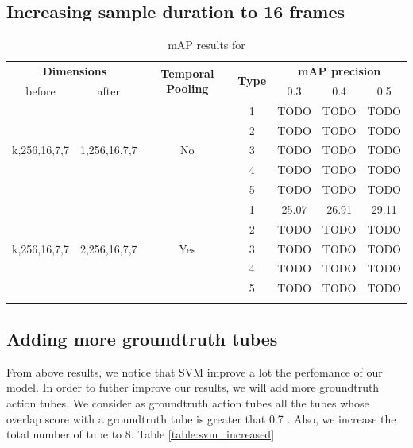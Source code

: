 \documentclass{report}
\begin{document}
\subsection{Increasing sample duration to 16 frames}

\begin{center}
\begin{longtable}{||c | c| c| c||c c c||}

  \hline
 \multicolumn{2}{||c|}{\textbf{Dimensions}} & \multirow{2}{4.5em}{\textbf{Temporal Pooling}} &\multirow{2}{*}{ \textbf{Type}} &\multicolumn{3}{|c||}{\textbf{mAP precision}}\\

  before & after & {} & {} & 0.3 &  0.4 & 0.5 \\
  \hline   \hline

  \multirow{5}{*}{k,256,16,7,7} & \multirow{5}{*}{1,256,16,7,7} & \multirow{5}{*}{No}  & 1 & TODO & TODO & TODO \\
  \cline{4-7}

  {} & {} & {} & 2 & TODO & TODO & TODO \\
  \cline{4-7}
  {} & {} & {} & 3 & TODO & TODO & TODO \\
  \cline{4-7}
  {} & {} & {} & 4 & TODO & TODO & TODO \\
  \cline{4-7}
  {} & {} & {} & 5 & TODO & TODO & TODO \\
  \hline

  \multirow{5}{*}{k,256,16,7,7} & \multirow{5}{*}{2,256,16,7,7} & \multirow{5}{*}{Yes}  & 1 & 25.07 & 26.91 & 29.11 \\
  \cline{4-7}

  {} & {} & {} & 2 & TODO & TODO & TODO \\
  \cline{4-7}
  {} & {} & {} & 3 & TODO & TODO & TODO \\
  \cline{4-7}
  {} & {} & {} & 4 & TODO & TODO & TODO \\
  \cline{4-7}
  {} & {} & {} & 5 & TODO & TODO & TODO \\
  \hline
  \caption{mAP results for   }
  \label{table:svm_temp_pooling}
\end{longtable} 
\end{center}

\subsection{Adding more groundtruth tubes}
From above results, we notice that SVM improve a lot the perfomance of our model. In order to futher improve our results, we will
add more groundtruth action tubes. We consider as groundtruth action tubes all the tubes whose overlap score  with a groundtruth tube is
greater that 0.7 . Also, we increase the total number of tube to 8. Table \ref{table:svm_increased}
\end{document}
